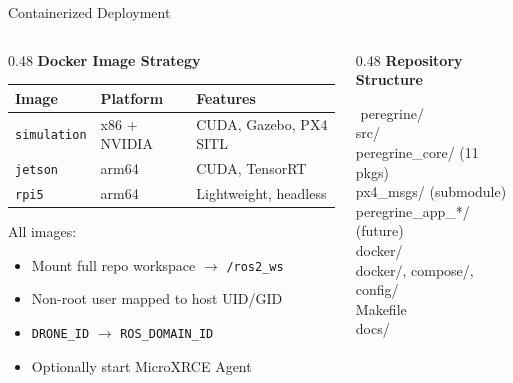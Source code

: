 \documentclass[aspectratio=169, 10pt]{beamer}
\begin{document}
\begin{frame}{Containerized Deployment}
\begin{columns}[T]
\begin{column}{0.48\textwidth}
\textbf{Docker Image Strategy}

\vspace{0.3em}
\small
\begin{tabular}{@{}llp{2.8cm}@{}}
\toprule
\textbf{Image} & \textbf{Platform} & \textbf{Features} \\
\midrule
\texttt{simulation} & x86 + NVIDIA & CUDA, Gazebo, PX4 SITL \\
\texttt{jetson} & arm64 & CUDA, TensorRT \\
\texttt{rpi5} & arm64 & Lightweight, headless \\
\bottomrule
\end{tabular}

\vspace{0.5em}
All images:
\begin{itemize}\scriptsize
  \item Mount full repo workspace $\to$ \texttt{/ros2\_ws}
  \item Non-root user mapped to host UID/GID
  \item \texttt{DRONE\_ID} $\to$ \texttt{ROS\_DOMAIN\_ID}
  \item Optionally start MicroXRCE Agent
\end{itemize}
\end{column}
\begin{column}{0.48\textwidth}
\textbf{Repository Structure}

\vspace{0.3em}
\ttfamily\scriptsize
\begin{tabbing}
\hspace{0.4cm}\=\hspace{0.4cm}\=\kill
peregrine/ \\
\> src/ \\
\>\> peregrine\_core/ {\normalfont\tiny(11 pkgs)} \\
\>\> px4\_msgs/ {\normalfont\tiny(submodule)} \\
\>\> peregrine\_app\_*/ {\normalfont\tiny(future)} \\
\> docker/ \\
\>\> docker/, compose/, config/ \\
\>\> Makefile \\
\> docs/
\end{tabbing}
\rmfamily


\end{column}
\end{columns}
\end{frame}
\end{document}
